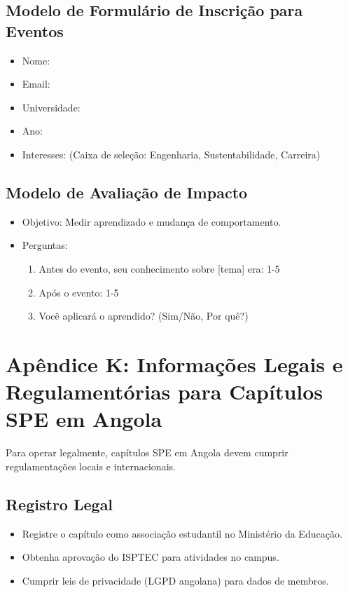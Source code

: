 \documentclass[12pt]{article}
\begin{document}
\subsection{Modelo de Formulário de Inscrição para Eventos}
\begin{itemize}
    \item Nome: 
    \item Email: 
    \item Universidade: 
    \item Ano: 
    \item Interesses: (Caixa de seleção: Engenharia, Sustentabilidade, Carreira)
\end{itemize}

\subsection{Modelo de Avaliação de Impacto}
\begin{itemize}
    \item Objetivo: Medir aprendizado e mudança de comportamento.
    \item Perguntas:
      \begin{enumerate}
        \item Antes do evento, seu conhecimento sobre [tema] era: 1-5
        \item Após o evento: 1-5
        \item Você aplicará o aprendido? (Sim/Não, Por quê?)
      \end{enumerate}
\end{itemize}

\clearpage
\section{Apêndice K: Informações Legais e Regulamentórias para Capítulos SPE em Angola}

Para operar legalmente, capítulos SPE em Angola devem cumprir regulamentações locais e internacionais.

\subsection{Registro Legal}
\begin{itemize}
    \item Registre o capítulo como associação estudantil no Ministério da Educação.
    \item Obtenha aprovação do ISPTEC para atividades no campus.
    \item Cumprir leis de privacidade (LGPD angolana) para dados de membros.
\end{itemize}
\end{document}
